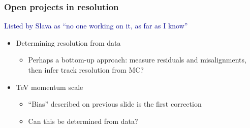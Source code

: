 \documentclass[compress]{beamer}
\begin{document}
\begin{frame}
\frametitle{Open projects in resolution}

\textcolor{darkblue}{Listed by Slava as ``no one working on it, as far as I know''}

\vspace{0.5 cm}
\begin{itemize}\setlength{\itemsep}{0.5 cm}
\item Determining resolution from data
\begin{itemize}\setlength{\itemsep}{0.25 cm}
\item Perhaps a bottom-up approach: measure residuals and
misalignments, then infer track resolution from MC?
\end{itemize}

\item TeV momentum scale
\begin{itemize}\setlength{\itemsep}{0.25 cm}
\item ``Bias'' described on previous slide is the first correction
\item Can this be determined from data?
\end{itemize}

\end{itemize}
\end{frame}
\end{document}
